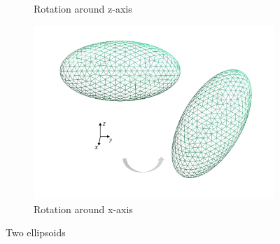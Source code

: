 \begin{figure}[H]
\begin{subfigure}{.5\linewidth}
    \caption{Rotation around z-axis}
    \label{Rotation around z-axis}
    \end{subfigure}%
    \begin{subfigure}{.5\linewidth}
    \centering
    \includegraphics[scale = 0.4]{figures/Ellipsoid_x_axis}
    \caption{Rotation around x-axis}
    \label{Rotation around x-axis}
    \end{subfigure}
    \caption{Two ellipsoids}
    \label{Two ellipsoids}
    \end{figure}

